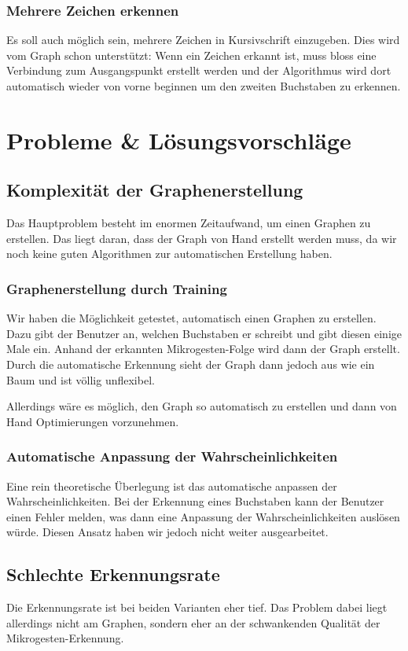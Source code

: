 \subsubsection{Mehrere Zeichen erkennen}
Es soll auch möglich sein, mehrere Zeichen in Kursivschrift einzugeben. Dies wird vom Graph schon unterstützt: Wenn ein Zeichen erkannt ist, muss bloss eine Verbindung zum Ausgangspunkt erstellt werden und der Algorithmus wird dort automatisch wieder von vorne beginnen um den zweiten Buchstaben zu erkennen.

\section{Probleme \& Lösungsvorschläge}
\subsection{Komplexität der Graphenerstellung}
Das Hauptproblem besteht im enormen Zeitaufwand, um einen Graphen zu erstellen. Das liegt daran, dass der Graph von Hand erstellt werden muss, da wir noch keine guten Algorithmen zur automatischen Erstellung haben.

\subsubsection{Graphenerstellung durch Training}
Wir haben die Möglichkeit getestet, automatisch einen Graphen zu erstellen. Dazu gibt der Benutzer an, welchen Buchstaben er schreibt und gibt diesen einige Male ein. Anhand der erkannten Mikrogesten-Folge wird dann der Graph erstellt. Durch die automatische Erkennung sieht der Graph dann jedoch aus wie ein Baum und ist völlig unflexibel. 

Allerdings wäre es möglich, den Graph so automatisch zu erstellen und dann von Hand Optimierungen vorzunehmen.

\subsubsection{Automatische Anpassung der Wahrscheinlichkeiten}
Eine rein theoretische Überlegung ist das automatische anpassen der Wahrscheinlichkeiten. Bei der Erkennung eines Buchstaben kann der Benutzer einen Fehler melden, was dann eine Anpassung der Wahrscheinlichkeiten auslösen würde. 
Diesen Ansatz haben wir jedoch nicht weiter ausgearbeitet.

\subsection{Schlechte Erkennungsrate}
Die Erkennungsrate ist bei beiden Varianten eher tief. Das Problem dabei liegt allerdings nicht am Graphen, sondern eher an der schwankenden Qualität der Mikrogesten-Erkennung.

